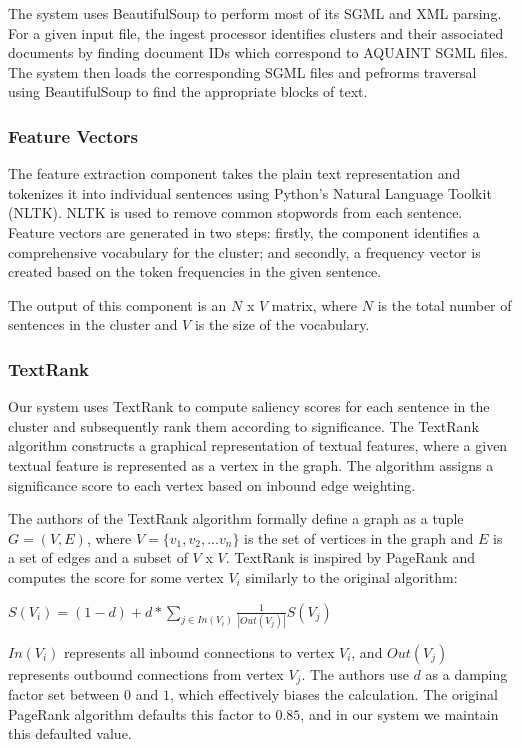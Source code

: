 \documentclass[11pt]{article}
\begin{document}
The system uses BeautifulSoup to perform most of its SGML and XML parsing. For a given input file, the ingest processor identifies clusters and their associated documents by finding document IDs which correspond to AQUAINT SGML files. The system then loads the corresponding SGML files and pefrorms traversal using BeautifulSoup to find the appropriate blocks of text.
\subsubsection{Feature Vectors}
The feature extraction component takes the plain text representation and tokenizes it into individual sentences using Python's Natural Language Toolkit (NLTK). NLTK is used to remove common stopwords from each sentence. Feature vectors are generated in two steps: firstly, the component identifies a comprehensive vocabulary for the cluster; and secondly, a frequency vector is created based on the token frequencies in the given sentence. 

The output of this component is an $N$ x $V$ matrix, where $N$ is the total number of sentences in the cluster and $V$ is the size of the vocabulary. 
\subsubsection{TextRank}
Our system uses TextRank to compute saliency scores for each sentence in the cluster and subsequently rank them according to significance. The TextRank algorithm constructs a graphical representation of textual features, where a given textual feature is represented as a vertex in the graph. The algorithm assigns a significance score to each vertex based on inbound edge weighting.

The authors of the TextRank algorithm formally define a graph as a tuple $G = (V,E)$, where $V = \{v_1, v_2, ... v_n\}$ is the set of vertices in the graph and $E$ is a set of edges and a subset of $V$ x $V$. TextRank is inspired by PageRank and computes the score for some vertex $V_i$ similarly to the original algorithm:
\begin{center}
    $S(V_i) = (1 - d) + d * \sum_{j \in In(V_i)} \frac{1}{|Out(V_j)|}S(V_j)$
\end{center}
$In(V_i)$ represents all inbound connections to vertex $V_i$, and $Out(V_j)$ represents outbound connections from vertex $V_j$. The authors use $d$ as a damping factor set between $0$ and $1$, which effectively biases the calculation. The original PageRank algorithm defaults this factor to $0.85$, and in our system we maintain this defaulted value.
\end{document}
